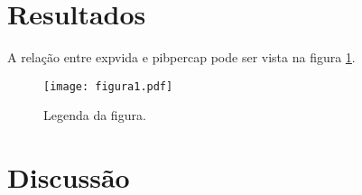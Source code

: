\documentclass[a4paper]{article}
\begin{document}
\section{Resultados}

A relação entre expvida e pibpercap pode ser vista na figura \ref{fig:plot}.

\begin{figure}[h]
\centering
\texttt{[image: figura1.pdf]}
\caption{Legenda da figura.}
\label{fig:plot}
\end{figure}

\section{Discussão}
\end{document}
